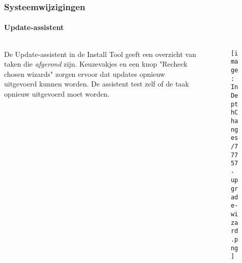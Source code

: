 \begin{frame}[fragile]
	\frametitle{Systeemwijzigingen}
	\framesubtitle{Update-assistent}

	\begin{columns}[T]
		\begin{column}{.5\textwidth}
			De Update-assistent in de Install Tool geeft een overzicht van taken die \textit{afgerond} zijn.
			\newline\newline
			Keuzevakjes en een knop "Recheck chosen wizards" zorgen ervoor dat updates opnieuw uitgevoerd kunnen worden.
			De assistent test zelf of de taak opnieuw uitgevoerd moet worden.
		\end{column}
		\begin{column}{.5\textwidth}
			\begin{figure}\vspace*{-0.5cm}
				\texttt{[image: InDepthChanges/77757-upgrade-wizard.png]}
			\end{figure}
		\end{column}
	\end{columns}

\end{frame}










